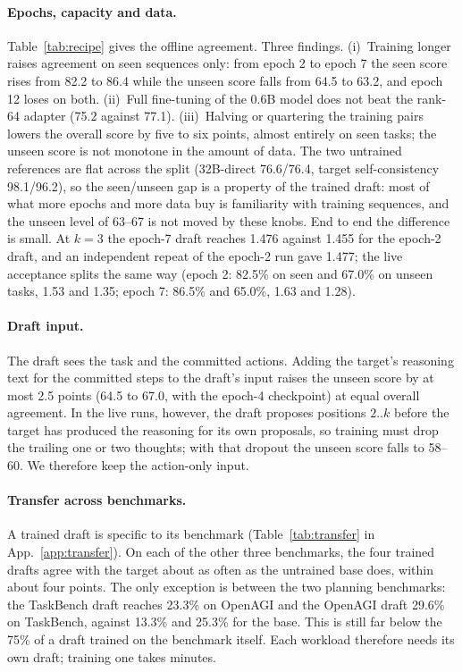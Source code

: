 \paragraph{Epochs, capacity and data.}
Table~\ref{tab:recipe} gives the offline agreement. Three findings. (i)~Training longer raises agreement
on seen sequences only: from epoch 2 to epoch 7 the seen score rises from 82.2 to 86.4 while the unseen
score falls from 64.5 to 63.2, and epoch 12 loses on both. (ii)~Full fine-tuning of the 0.6B model does
not beat the rank-64 adapter (75.2 against 77.1). (iii)~Halving or quartering the training pairs lowers
the overall score by five to six points, almost entirely on seen tasks; the unseen score is not monotone in the
amount of data. The two untrained references are flat across the split (32B-direct 76.6/76.4, target
self-consistency 98.1/96.2), so the seen/unseen gap is a property of the trained draft: most of what more
epochs and more data buy is familiarity with training sequences, and the unseen level of 63--67 is not
moved by these knobs. End to end the difference is small. At $k{=}3$ the epoch-7 draft reaches
1.476\xx{} against 1.455\xx{} for the epoch-2 draft, and an independent repeat of the epoch-2 run gave
1.477\xx{}; the live acceptance splits the same way (epoch 2: 82.5\% on seen and 67.0\% on unseen
tasks, 1.53\xx{} and 1.35\xx{}; epoch 7: 86.5\% and 65.0\%, 1.63\xx{} and 1.28\xx{}).

\paragraph{Draft input.}
The draft sees the task and the committed actions. Adding the target's reasoning text for the committed
steps to the draft's input raises the unseen score by at most 2.5 points (64.5 to 67.0, with the epoch-4
checkpoint) at equal overall agreement. In the live runs, however, the draft proposes positions $2..k$ before the
target has produced the reasoning for its own proposals, so training must drop the trailing one or two
thoughts; with that dropout the unseen score falls to 58--60. We therefore keep the action-only input.

\paragraph{Transfer across benchmarks.}
A trained draft is specific to its benchmark (Table~\ref{tab:transfer} in App.~\ref{app:transfer}). On each
of the other three benchmarks, the four trained drafts agree with the target about as often as the untrained
base does, within about four points. The only exception is between the two planning benchmarks: the TaskBench
draft reaches 23.3\% on OpenAGI and the OpenAGI draft 29.6\% on TaskBench, against 13.3\% and 25.3\% for the
base. This is still far below the 75\% of a draft trained on the benchmark itself. Each workload therefore
needs its own draft; training one takes minutes.

